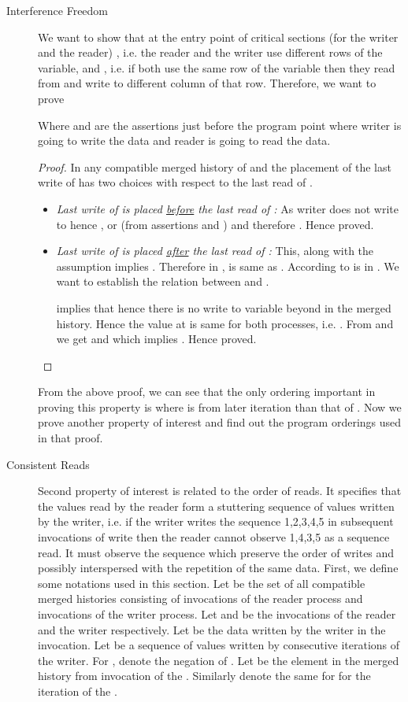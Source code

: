 \begin{description}
 \item [Interference Freedom]
We want to show that at the entry point of critical sections (for the writer and the reader) , 
i.e. the reader and the writer use different rows of the  variable, and 
, i.e. if both use the same row of the  variable then 
they read from and write to different column of that row. 
Therefore, we want to prove 

Where  and  are the assertions just before the program point where writer is going to write the data and reader is going to read the data.
\begin{proof}
In any compatible merged history  of  and  the placement of the last write  of  has 
two choices with respect to the last read  of .
\begin{itemize}
 \item \textit{Last write  of  is placed \ul{before} the last read  of :} As writer does not 
write to  hence , or  (from assertions  and ) and therefore . Hence proved.

 \item \textit{Last write  of  is placed \ul{after} the last read  of :} This, along with the assumption  implies
. Therefore in ,  is same as . According to  
 is in . We want to establish the relation between  and .

 implies that \ul{} hence there is no write to variable  beyond  in the merged history. 
Hence the value at  is same for both processes, i.e. . From  and  we get  and 
which implies . Hence proved. 
\end{itemize}
\end{proof}
From the above proof, we can see that the only ordering important in proving this property is  where  is from later iteration than that of . Now
we prove another property of interest and find out the program orderings used in that proof.

\item [Consistent Reads]
Second property of interest is related to the order of reads. It specifies that the values read by the reader form a stuttering sequence of values written by the writer, i.e. if the writer writes the sequence 1,2,3,4,5 in subsequent invocations of write then the reader cannot observe 1,4,3,5 as a sequence read. It must observe the sequence which preserve the order of writes and possibly interspersed with the repetition of the same data. First, we define some notations used in this section.
Let  be the set of all compatible merged histories consisting of  invocations of the reader process and  invocations of the writer process. 
Let  and  be the  invocations of the reader and the writer respectively. Let  be the data written by the writer in the  invocation. 
Let  be a sequence  of values written by  consecutive iterations of the writer. For ,  denote the negation of .
Let  be the element  in the merged history from  invocation of the . Similarly  denote the same for for the  iteration of the .


\end{description}
